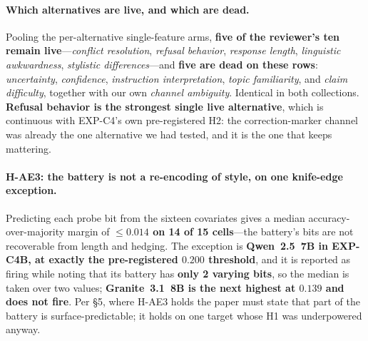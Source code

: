 \paragraph{Which alternatives are live, and which are dead.} Pooling the per-alternative single-feature arms, \textbf{five of the reviewer's ten remain live}---\emph{conflict resolution}, \emph{refusal behavior}, \emph{response length}, \emph{linguistic awkwardness}, \emph{stylistic differences}---and \textbf{five are dead on these rows}: \emph{uncertainty}, \emph{confidence}, \emph{instruction interpretation}, \emph{topic familiarity}, and \emph{claim difficulty}, together with our own \emph{channel ambiguity}. Identical in both collections. \textbf{Refusal behavior is the strongest single live alternative}, which is continuous with EXP-C4's own pre-registered H2: the correction-marker channel was already the one alternative we had tested, and it is the one that keeps mattering.

\paragraph{H-AE3: the battery is not a re-encoding of style, on one knife-edge exception.} Predicting each probe bit from the sixteen covariates gives a median accuracy-over-majority margin of \textbf{$\le\!0.014$ on 14 of 15 cells}---the battery's bits are not recoverable from length and hedging. The exception is \textbf{Qwen~2.5~7B in EXP-C4B, at exactly the pre-registered $0.200$ threshold}, and it is reported as firing while noting that its battery has \textbf{only 2 varying bits}, so the median is taken over two values; \textbf{Granite~3.1~8B is the next highest at $0.139$ and does not fire}. Per \S5, where H-AE3 holds the paper must state that part of the battery is surface-predictable; it holds on one target whose H1 was underpowered anyway.

